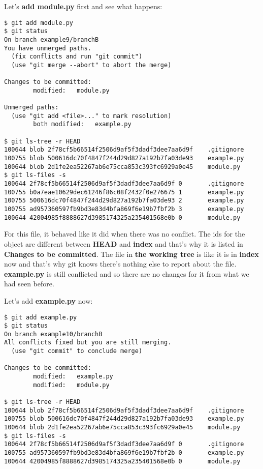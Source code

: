 Let's {\bf add module.py} first and see what happens:

\begin{lstlisting}[style=console_style,
	basicstyle=\small,
	caption=After adding {\bf module.py}]
$ git add module.py 
$ git status         
On branch example9/branchB
You have unmerged paths.
  (fix conflicts and run "git commit")
  (use "git merge --abort" to abort the merge)

Changes to be committed:
        modified:   module.py

Unmerged paths:
  (use "git add <file>..." to mark resolution)
        both modified:   example.py

$ git ls-tree -r HEAD
100644 blob 2f78cf5b66514f2506d9af5f3dadf3dee7aa6d9f    .gitignore
100755 blob 500616dc70f4847f244d29d827a192b7fa03de93    example.py
100644 blob 2d1fe2ea52267ab6e75cca853c393fc6929a0e45    module.py
$ git ls-files -s    
100644 2f78cf5b66514f2506d9af5f3dadf3dee7aa6d9f 0       .gitignore
100755 b0a7eae10629dec61246f86c08f2432f0e276675 1       example.py
100755 500616dc70f4847f244d29d827a192b7fa03de93 2       example.py
100755 ad957360597fb9bd3e83d4bfa869f6e19b7fbf2b 3       example.py
100644 42004985f8888627d3985174325a235401568e0b 0       module.py
\end{lstlisting}

For this file, it behaved like it did when there was no conflict. The ids for the object are different between {\bf HEAD} and
{\bf index} and that's why it is listed in {\bf Changes to be committed}. The file in {\bf the working tree} is like it is in
{\bf index} now and that's why git knows there's nothing else to report about the file. {\bf example.py} is still conflicted
and so there are no changes for it from what we had seen before.

Let's add {\bf example.py} now:

\begin{lstlisting}[style=console_style,
	basicstyle=\small,
	caption=After adding {\bf example.py}]
$ git add example.py 
$ git status
On branch example10/branchB
All conflicts fixed but you are still merging.
  (use "git commit" to conclude merge)

Changes to be committed:
        modified:   example.py
        modified:   module.py

$ git ls-tree -r HEAD
100644 blob 2f78cf5b66514f2506d9af5f3dadf3dee7aa6d9f    .gitignore
100755 blob 500616dc70f4847f244d29d827a192b7fa03de93    example.py
100644 blob 2d1fe2ea52267ab6e75cca853c393fc6929a0e45    module.py
$ git ls-files -s
100644 2f78cf5b66514f2506d9af5f3dadf3dee7aa6d9f 0       .gitignore
100755 ad957360597fb9bd3e83d4bfa869f6e19b7fbf2b 0       example.py
100644 42004985f8888627d3985174325a235401568e0b 0       module.py
\end{lstlisting}

